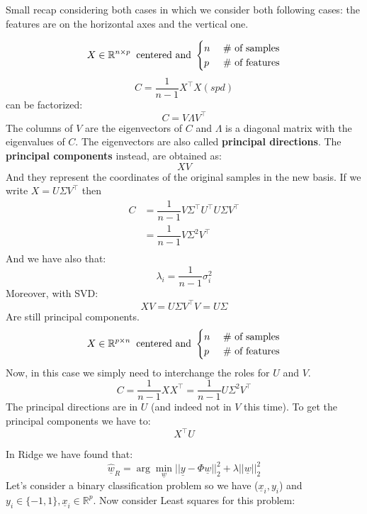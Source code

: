 Small recap considering both cases in which we consider both following cases: the features are on the horizontal axes and the vertical one.
\setlength{\columnseprule}{0.4pt}
\begin{multicols}{2}
    \[
        X \in \mathbb{R}^{n \times p} \hspace{0.2cm} \text{centered and } \begin{cases}
        n & \text{ \# of samples}\\
        p & \text{ \# of features}
    \end{cases}
    \]
    \[
        C = \dfrac{1}{n-1}X^\intercal X (spd)    
    \]
    can be factorized:
    \[
        C = V\Lambda V^\intercal    
    \]
    The columns of $V$ are the eigenvectors of $C$ and $\Lambda$ is a diagonal matrix with the eigenvalues of $C$. The eigenvectors are also called \textbf{principal directions}. The \textbf{principal components} instead, are obtained as:
    \[
        XV    
    \]
    And they represent the coordinates of the original samples in the new basis. If we write $X = U\Sigma V^\intercal$ then
    \[
        \begin{split}
            C &= \dfrac{1}{n-1}V\Sigma^\intercal U^\intercal U\Sigma V^\intercal \\
            &= \dfrac{1}{n-1}V\Sigma^2 V^\intercal \\
        \end{split}    
    \]
    And we have also that:
    \[
        \lambda_i = \dfrac{1}{n-1}\sigma_i^2    
    \]
    Moreover, with SVD:
    \[
        XV = U\Sigma V^\intercal V = U\Sigma    
    \]
    Are still principal components.
    \newcolumn
    \[
        X \in \mathbb{R}^{p \times n} \hspace{0.2cm} \text{centered and } \begin{cases}
        n & \text{ \# of samples}\\
        p & \text{ \# of features}
    \end{cases}
    \]
    Now, in this case we simply need to interchange the roles for $U$ and $V$.
    \[
        C = \dfrac{1}{n-1}XX^\intercal = \dfrac{1}{n-1}U\Sigma^2 V^\intercal
    \]
    The principal directions are in $U$ (and indeed not in $V$ this time). To get the principal components we have to:
    \[
        X^\intercal U    
    \]
\end{multicols}
In Ridge we have found that:
\[
\underline{\hat{w}}_{R} = \arg \min_{\underline{w}} ||\underline{y} - \Phi\underline{w}||_2^2 + \lambda ||\underline{w}||_2^2
\]
Let's consider a binary classification problem so we have ($\underline{x}_i, y_i$) and $y_i \in \{-1, 1\}, \underline{x}_i \in \mathbb{R}^p$. Now consider Least squares for this problem:
